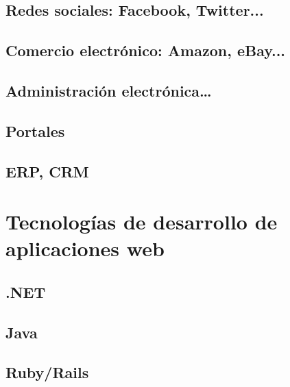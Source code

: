 \documentclass[a4paper,11pt,spanish]{sphinxmanual}
\begin{document}
\subsection{Redes sociales: Facebook, Twitter...}
\label{\detokenize{introduccion-al-desarrollo-web:redes-sociales-facebook-twitter}}

\subsection{Comercio electrónico: Amazon, eBay...}
\label{\detokenize{introduccion-al-desarrollo-web:comercio-electronico-amazon-ebay}}

\subsection{Administración electrónica…}
\label{\detokenize{introduccion-al-desarrollo-web:administracion-electronica}}

\subsection{Portales}
\label{\detokenize{introduccion-al-desarrollo-web:portales}}

\subsection{ERP, CRM}
\label{\detokenize{introduccion-al-desarrollo-web:erp-crm}}

\section{Tecnologías de desarrollo de aplicaciones web}
\label{\detokenize{introduccion-al-desarrollo-web:tecnologias-de-desarrollo-de-aplicaciones-web}}

\subsection{.NET}
\label{\detokenize{introduccion-al-desarrollo-web:net}}

\subsection{Java}
\label{\detokenize{introduccion-al-desarrollo-web:java}}

\subsection{Ruby/Rails}
\label{\detokenize{introduccion-al-desarrollo-web:ruby-rails}}
\end{document}
